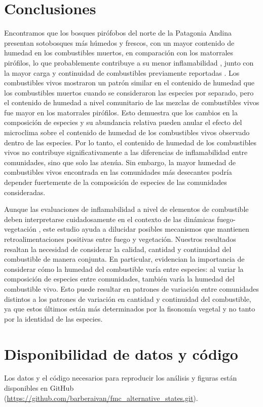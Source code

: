 \section{Conclusiones}

Encontramos que los bosques pirófobos del norte de la Patagonia Andina presentan sotobosques más húmedos y frescos, con un mayor contenido de humedad en los combustibles muertos, en comparación con los matorrales pirófilos, lo que probablemente contribuye a su menor inflamabilidad \citep{mermoz_landscape_2005, morales_stochastic_2015, paritsis_positive_2015, tiribelli_non-additive_2019}, junto con la mayor carga y continuidad de combustibles previamente reportadas \citep{paritsis_positive_2015, tiribelli_changes_2018}. Los combustibles vivos mostraron un patrón similar en el contenido de humedad que los combustibles muertos cuando se consideraron las especies por separado, pero el contenido de humedad a nivel comunitario de las mezclas de combustibles vivos fue mayor en los matorrales pirófilos. Esto demuestra que los cambios en la composición de especies y su abundancia relativa pueden anular el efecto del microclima sobre el contenido de humedad de los combustibles vivos observado dentro de las especies. Por lo tanto, el contenido de humedad de los combustibles vivos no contribuye significativamente a las diferencias de inflamabilidad entre comunidades, sino que solo las atenúa. Sin embargo, la mayor humedad de combustibles vivos encontrada en las comunidades más desecantes podría depender fuertemente de la composición de especies de las comunidades consideradas.

Aunque las evaluaciones de inflamabilidad a nivel de elementos de combustible deben interpretarse cuidadosamente en el contexto de las dinámicas fuego-vegetación \citep{fernandes_plant_2012}, este estudio ayuda a dilucidar posibles mecanismos que mantienen retroalimentaciones positivas entre fuego y vegetación. Nuestros resultados resaltan la necesidad de considerar la calidad, cantidad y continuidad del combustible de manera conjunta. En particular, evidencian la importancia de considerar cómo la humedad del combustible varía entre especies: al variar la composición de especies entre comunidades, también varía la humedad del combustible vivo. Esto puede resultar en patrones de variación entre comunidades distintos a los patrones de variación en cantidad y continuidad del combustible, ya que estos últimos están más determinados por la fisonomía vegetal y no tanto por la identidad de las especies.

\section*{Disponibilidad de datos y código}

Los datos y el código necesarios para reproducir los análisis y figuras están disponibles en GitHub (\url{https://github.com/barberaivan/fmc_alternative_states.git}).

